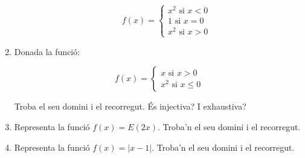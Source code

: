 \documentclass{article}
\begin{document}
\begin{enumerate}
\begin{enumerate}
	$$
	f(x)=
	\begin{cases}
	x^2 \mbox{ si } x < 0 \\
	1 \mbox{ si } x=0 \\
    x^2 \mbox{ si } x > 0
	\end{cases}
	$$
	
\end{enumerate}

\item Donada la funció:

$$
f(x)=
\begin{cases}
x \mbox{ si } x > 0 \\
x^2 \mbox{ si } x \le 0

\end{cases}
$$

Troba el seu domini i el recorregut. És injectiva? I exhaustiva?
 
\item Representa la funció $f(x)=E(2x)$. Troba'n el seu domini i el recorregut.
\item Representa la funció $f(x)=|x-1|$. Troba'n el seu domini i el recorregut.


\end{enumerate}
 
\end{document}

